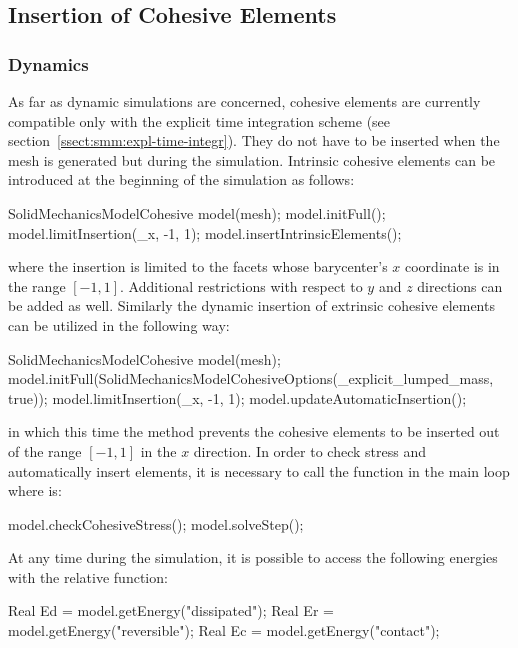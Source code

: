 \subsection{Insertion of Cohesive Elements}
\subsubsection{Dynamics}
As far as dynamic simulations are concerned, cohesive elements are
currently compatible only with the explicit time integration scheme
(see section~\ref{ssect:smm:expl-time-integr}). They do not have to be
inserted when the mesh is generated but during the
simulation. Intrinsic cohesive elements can be introduced at the
beginning of the simulation as follows:
\begin{cpp}
  SolidMechanicsModelCohesive model(mesh);
  model.initFull();
  model.limitInsertion(_x, -1, 1);
  model.insertIntrinsicElements();
\end{cpp}
where the insertion is limited to the facets whose barycenter's $x$
coordinate is in the range $[-1,1]$. Additional restrictions with
respect to $y$ and $z$ directions can be added as well. Similarly the
dynamic insertion of extrinsic cohesive elements can be utilized in
the following way:
\begin{cpp}
  SolidMechanicsModelCohesive model(mesh);
  model.initFull(SolidMechanicsModelCohesiveOptions(_explicit_lumped_mass, true));
  model.limitInsertion(_x, -1, 1);
  model.updateAutomaticInsertion();
\end{cpp}
in which this time the method  prevents the
cohesive elements to be inserted out of the range $[-1,1]$ in the $x$
direction. In order to check stress and automatically insert elements,
it is necessary to call the function  in the
main loop where  is:
\begin{cpp}
  model.checkCohesiveStress();
  model.solveStep();
\end{cpp}

At any time during the simulation, it is possible to access the
following energies with the relative function:
\begin{cpp}
  Real Ed = model.getEnergy("dissipated");
  Real Er = model.getEnergy("reversible");
  Real Ec = model.getEnergy("contact");
\end{cpp}

